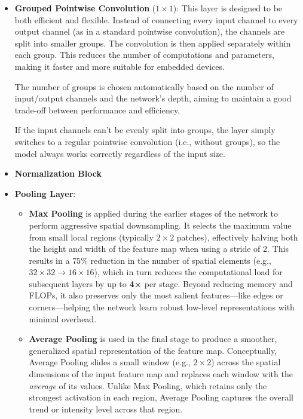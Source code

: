 \begin{itemize}

    \item \textbf{Grouped Pointwise Convolution} (\(1 \times 1\)): This layer is designed to be both efficient and flexible. Instead of connecting every input channel to every output channel (as in a standard pointwise convolution), the channels are split into smaller groups. The convolution is then applied separately within each group. This reduces the number of computations and parameters, making it faster and more suitable for embedded devices.
    
    The number of groups is chosen automatically based on the number of input/output channels and the network's depth, aiming to maintain a good trade-off between performance and efficiency.
    
    If the input channels can't be evenly split into groups, the layer simply switches to a regular pointwise convolution (i.e., without groups), so the model always works correctly regardless of the input size.
  
  \item \textbf{Normalization Block}
  
  \item \textbf{Pooling Layer}:
  \begin{itemize}

    \item \textbf{Max Pooling} is applied during the earlier stages of the network to perform aggressive spatial downsampling. It selects the maximum value from small local regions (typically $2 \times 2$ patches), effectively halving both the height and width of the feature map when using a stride of 2. This results in a $75\%$ reduction in the number of spatial elements (e.g., $32 \times 32 \rightarrow 16 \times 16$), which in turn reduces the computational load for subsequent layers by up to \textbf{4×} per stage. Beyond reducing memory and FLOPs, it also preserves only the most salient features—like edges or corners—helping the network learn robust low-level representations with minimal overhead.

    \item \textbf{Average Pooling} is used in the final stage to produce a smoother, generalized spatial representation of the feature map. Conceptually, Average Pooling slides a small window (e.g., $2 \times 2$) across the spatial dimensions of the input feature map and replaces each window with the \emph{average} of its values. Unlike Max Pooling, which retains only the strongest activation in each region, Average Pooling captures the overall trend or intensity level across that region.


\end{itemize}
\end{itemize}
